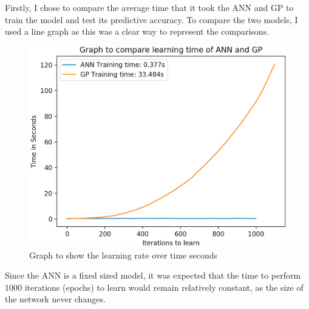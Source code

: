 \documentclass[11pt]{article}
\begin{document}
Firstly, I chose to compare the average time that it took the ANN and GP to train the model and test its predictive accuracy. To compare the two models, I used a line graph as this was a clear way to represent the comparisons.

\begin{figure}[h]
\centering
\includegraphics[scale = .45]{learning_rates}
\caption{Graph to show the learning rate over time seconds} 
\end{figure}
Since the ANN is a fixed sized model, it was expected that the time to perform 1000 iterations (epochs) to learn would remain relatively constant, as the size of the network never changes. 
\end{document}
